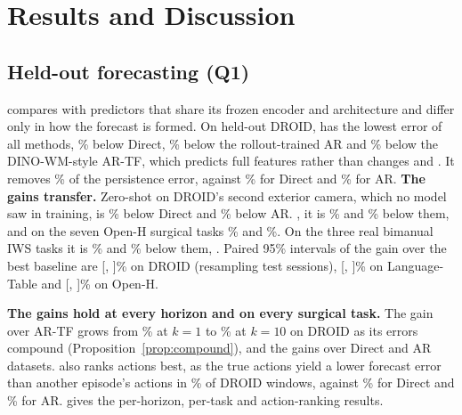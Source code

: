 \section{Results and Discussion}
\label{sec:results}

\subsection{Held-out forecasting (Q1)}
\label{sec:forecasting}

 compares \ours{} with predictors that share its frozen encoder and architecture and differ only in how the forecast is formed.
%
On held-out DROID, \ours{} has the lowest error of all methods, \droidVsDirect\% below Direct, \droidVsAR\%
below the rollout-trained AR and \droidVsARTF\% below the DINO-WM-style AR-TF, which predicts full features rather than changes and .
%
It removes \droidSkill\% of the persistence error, against \droidSkillDirect\% for Direct and \droidSkillAR\% for AR.
%
\textbf{The gains transfer.} Zero-shot on DROID's second exterior camera, which no model saw in training, \ours{} is
\camtwoVsDirect\% below Direct and \camtwoVsAR\% below AR.
%
, it is \ltVsDirect\% and \ltVsAR\% below them, and on
the seven Open-H surgical tasks \hamlynVsDirect\% and \hamlynVsAR\%. On the three real bimanual IWS tasks it is
\iwsVsDirect\% and \iwsVsAR\% below them, .
%
Paired 95\% intervals of the gain over the best baseline are [\droidCILo, \droidCIHi]\% on DROID (resampling
\droidTestSessions{} test sessions), [\ltCILo, \ltCIHi]\% on Language-Table and [\hamlynCILo, \hamlynCIHi]\% on Open-H.

\textbf{The gains hold at every horizon and on every surgical task.} The gain over AR-TF grows from
\gainDroidARTFOne\% at $k{=}1$ to \gainDroidARTFTen\% at $k{=}10$ on DROID as its errors compound
(Proposition~\ref{prop:compound}), and the gains over Direct and AR 
datasets.
%
\ours{} also ranks actions best, as the true actions yield a lower forecast error than another episode's actions in
\droidRankShift\% of DROID windows, against \droidRankDirect\% for Direct and \droidRankAR\% for AR.
%
 gives the per-horizon, per-task and action-ranking results.

